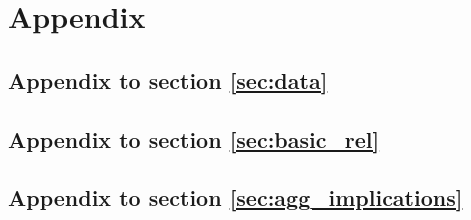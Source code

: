 \appendix
\section*{Appendix}
\label{sec:appendix}

\subsection*{Appendix to section \ref{sec:data}}




\FloatBarrier
\subsection*{Appendix to section \ref{sec:basic_rel}}



%

%
%
%




\FloatBarrier
\subsection*{Appendix to section \ref{sec:agg_implications}}






